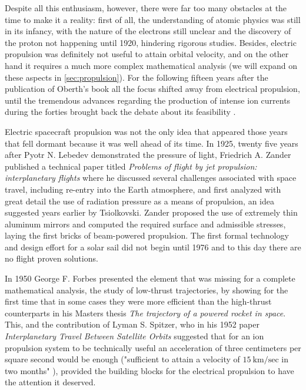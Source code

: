 Despite all this enthusiasm, however, there were far too many obstacles at the time to make it a reality: first of all, the understanding of atomic physics was still in its infancy, with the nature of the electrons still unclear and the discovery of the proton not happening until 1920, hindering rigorous studies. Besides, electric propulsion was definitely not useful to attain orbital velocity, and on the other hand it requires a much more complex mathematical analysis (we will expand on these aspects in \ref{sec:propulsion}). For the following fifteen years after the publication of Oberth's book all the focus shifted away from electrical propulsion, until the tremendous advances regarding the production of intense ion currents during the forties brought back the debate about its feasibility \cite{choueiri2004history}.

Electric spacecraft propulsion was not the only idea that appeared those years that fell dormant because it was well ahead of its time. In 1925, twenty five years after Pyotr N. Lebedev demonstrated the pressure of light, Friedrich A. Zander published a technical paper titled \textit{Problems of flight by jet propulsion: interplanetary flights} where he discussed several challenges associated with space travel, including re-entry into the Earth atmosphere, and first analyzed with great detail the use of radiation pressure as a means of propulsion, an idea suggested years earlier by Tsiolkovski. Zander proposed the use of extremely thin aluminum mirrors and computed the required surface and admissible stresses, laying the first bricks of beam-powered propulsion. The first formal technology and design effort for a solar sail did not begin until  1976 and to this day there are no flight proven solutions.

In 1950 George F. Forbes presented the element that was missing for a complete mathematical analysis, the study of low-thrust trajectories, by showing for the first time that in some cases they were more efficient than the high-thrust counterparts in his Masters thesis \textit{The trajectory of a powered rocket in space}. This, and the contribution of Lyman S. Spitzer, who in his 1952 paper \textit{Interplanetary Travel Between Satellite Orbits} suggested that for an ion propulsion system to be technically useful an acceleration of three centimeters per square second would be enough ("sufficient to attain a velocity of $15~\text{km/sec}$ in two months" \cite{spitzer1952interplanetary}), provided the building blocks for the electrical propulsion to have the attention it deserved.

